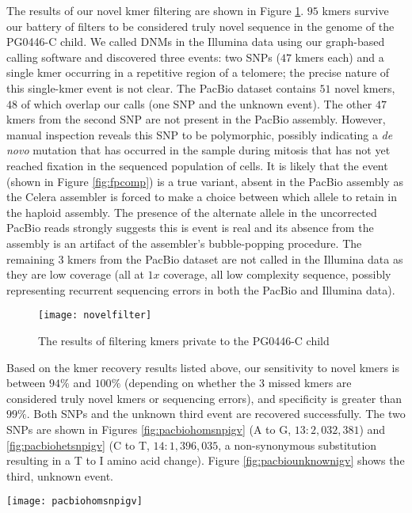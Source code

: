 The results of our novel kmer filtering are shown in Figure \ref{fig:novelfilter}.  $95$ kmers survive our battery of filters to be considered truly novel sequence in the genome of the PG0446-C child.  We called DNMs in the Illumina data using our graph-based calling software and discovered three events: two SNPs ($47$ kmers each) and a single kmer occurring in a repetitive region of a telomere; the precise nature of this single-kmer event is not clear.  The PacBio dataset contains $51$ novel kmers, $48$ of which overlap our calls (one SNP and the unknown event).  The other $47$ kmers from the second SNP are not present in the PacBio assembly.  However, manual inspection reveals this SNP to be polymorphic, possibly indicating a \textit{de novo} mutation that has occurred in the sample during mitosis that has not yet reached fixation in the sequenced population of cells.  It is likely that the event (shown in Figure \ref{fig:fpcomp}) is a true variant, absent in the PacBio assembly as the Celera assembler is forced to make a choice between which allele to retain in the haploid assembly.  The presence of the alternate allele in the uncorrected PacBio reads strongly suggests this is event is real and its absence from the assembly is an artifact of the assembler's bubble-popping procedure.  The remaining $3$ kmers from the PacBio dataset are not called in the Illumina data as they are low coverage (all at $1x$ coverage, all low complexity sequence, possibly representing recurrent sequencing errors in both the PacBio and Illumina data).

\begin{figure}[h!]
  \centering
    \texttt{[image: novelfilter]}
  \caption{The results of filtering kmers private to the PG0446-C child }
  \label{fig:novelfilter}
\end{figure}

Based on the kmer recovery results listed above, our sensitivity to novel kmers is between $94\%$ and $100\%$ (depending on whether the $3$ missed kmers are considered truly novel kmers or sequencing errors), and specificity is greater than $99\%$.  Both SNPs and the unknown third event are recovered successfully.  The two SNPs are shown in Figures \ref{fig:pacbiohomsnpigv} (A to G, $13:2,032,381$) and \ref{fig:pacbiohetsnpigv} (C to T, $14:1,396,035$, a non-synonymous substitution resulting in a T to I amino acid change).  Figure \ref{fig:pacbiounknownigv} shows the third, unknown event.

\begin{sidewaysfigure}[h!]
  \centering
    \texttt{[image: pacbiohomsnpigv]}
  \caption{IGV screenshot of an A to G SNP, showing reads and assembly information for the trio, aligned to the PacBio PG0446-C assembly.  Top panel: 803.  Middle two: GB4 reads and PacBio assembly (sliced to facilitate alignment).  Lower two: PG0446-C reads and contig containing the variant in question from the a. panel.}
  \label{fig:pacbiohomsnpigv}
\end{sidewaysfigure}

